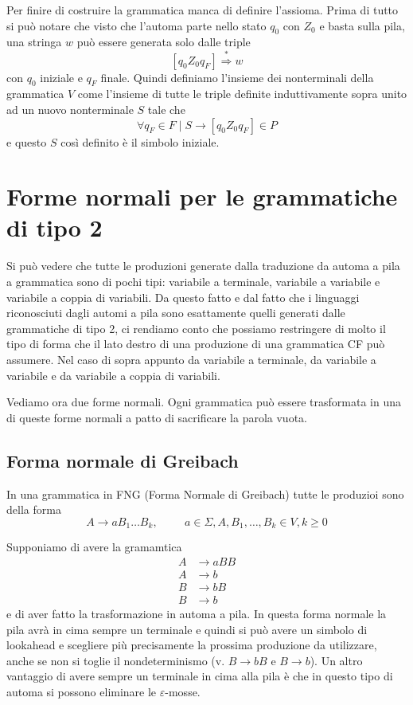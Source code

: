 \documentclass[12pt]{report}
\theoremstyle{definition}
\theoremstyle{regard}
\begin{document}
Per finire di costruire la grammatica manca di definire l'assioma.
Prima di tutto si può notare che visto che l'automa parte nello stato $q_0$ con $Z_0$ e basta sulla pila, una stringa $w$ può essere generata solo dalle triple 
$$[q_0Z_0q_F] \overset{*}{\Rightarrow} w$$
con $q_0$ iniziale e $q_F$ finale.
Quindi definiamo l'insieme dei nonterminali della grammatica $V$ come l'insieme di tutte le triple definite induttivamente sopra unito ad un nuovo nonterminale $S$ tale che
$$ \forall q_F \in F \mid S \rightarrow [q_0 Z_0 q_F] \in P $$
e questo $S$ così definito è il simbolo iniziale.

\section{Forme normali per le grammatiche di tipo 2}
Si può vedere che tutte le produzioni generate dalla traduzione da automa a pila a grammatica sono di pochi tipi: variabile a terminale, variabile a variabile e variabile a coppia di variabili.
Da questo fatto e dal fatto che i linguaggi riconosciuti dagli automi a pila sono esattamente quelli generati dalle grammatiche di tipo 2, ci rendiamo conto che possiamo restringere di molto il tipo di forma che il lato destro di una produzione di una grammatica CF può assumere.
Nel caso di sopra appunto da variabile a terminale, da variabile a variabile e da variabile a coppia di variabili.

Vediamo ora due forme normali.
Ogni grammatica può essere trasformata in una di queste forme normali a patto di sacrificare la parola vuota.

\subsection{Forma normale di Greibach}
In una grammatica in FNG (Forma Normale di Greibach) tutte le produzioi sono della forma
$$ A \rightarrow a B_1 \dots B_k, \hspace{1cm} a \in \Sigma, A, B_1, \dots, B_k \in V, k \geq 0 $$

Supponiamo di avere la gramamtica
\begin{align*}
	A &\rightarrow a B B \\
	A &\rightarrow b \\
	B &\rightarrow b B \\
	B &\rightarrow b
\end{align*}
e di aver fatto la trasformazione in automa a pila.
In questa forma normale la pila avrà in cima sempre un terminale e quindi si può avere un simbolo di lookahead e scegliere più precisamente la prossima produzione da utilizzare, anche se non si toglie il nondeterminismo (v. $B \rightarrow b B$ e $B \rightarrow b$).
Un altro vantaggio di avere sempre un terminale in cima alla pila è che in questo tipo di automa si possono eliminare le $\varepsilon$-mosse.
\end{document}
